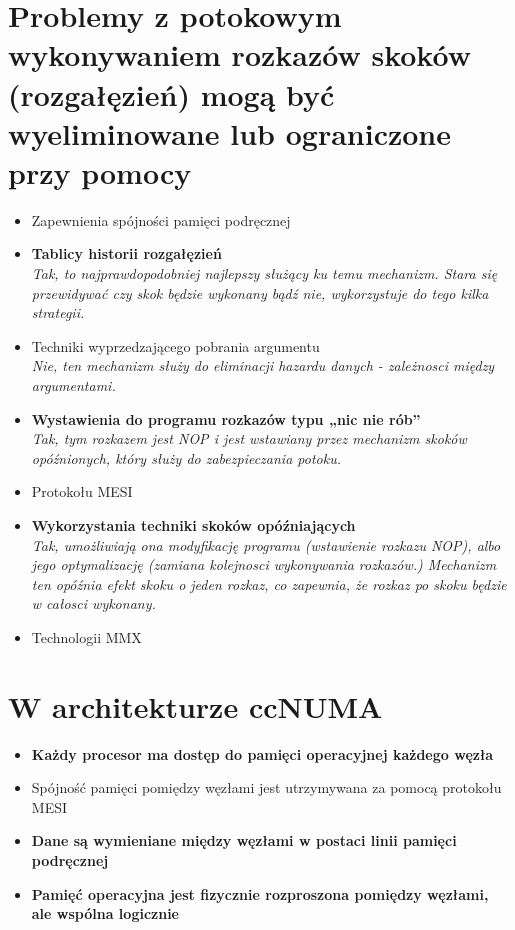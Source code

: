 \documentclass[a4paper,twoside]{article}
\begin{document}
\section{Problemy z potokowym wykonywaniem rozkazów skoków (rozgałęzień) mogą być wyeliminowane lub ograniczone przy pomocy}
	\begin{itemize}
    \item Zapewnienia spójności pamięci podręcznej
    \item \textbf{Tablicy historii rozgałęzień}\\
    {\small \emph{Tak, to najprawdopodobniej najlepszy służący ku temu mechanizm. Stara się przewidywać czy skok będzie wykonany bądź nie, wykorzystuje do tego kilka strategii.}}
    \item Techniki wyprzedzającego pobrania argumentu\\
    {\small \emph{Nie, ten mechanizm służy do eliminacji hazardu danych - zależnosci między argumentami.}}
    \item \textbf{Wystawienia do programu rozkazów typu „nic nie rób”}\\
    {\small \emph{Tak, tym rozkazem jest \emph{NOP} i jest wstawiany przez mechanizm skoków opóźnionych, który służy do zabezpieczania potoku.}}
    \item Protokołu MESI
    \item \textbf{Wykorzystania techniki skoków opóźniających}\\
    {\small \emph{Tak, umożliwiają ona modyfikację programu (wstawienie rozkazu NOP), albo jego optymalizację (zamiana kolejnosci wykonywania rozkazów.) Mechanizm ten opóźnia efekt skoku o jeden rozkaz, co zapewnia, że rozkaz po skoku będzie w całosci wykonany.}}
    \item Technologii MMX
    \end{itemize}

\section{W architekturze ccNUMA}
	\begin{itemize}
    \item \textbf{Każdy procesor ma dostęp do pamięci operacyjnej każdego węzła}
    \item Spójność pamięci pomiędzy węzłami jest utrzymywana za pomocą protokołu MESI
    \item \textbf{Dane są wymieniane między węzłami w postaci linii pamięci podręcznej}
    \item \textbf{Pamięć operacyjna jest fizycznie rozproszona pomiędzy węzłami, ale wspólna logicznie}
    \end{itemize}
\end{document}
